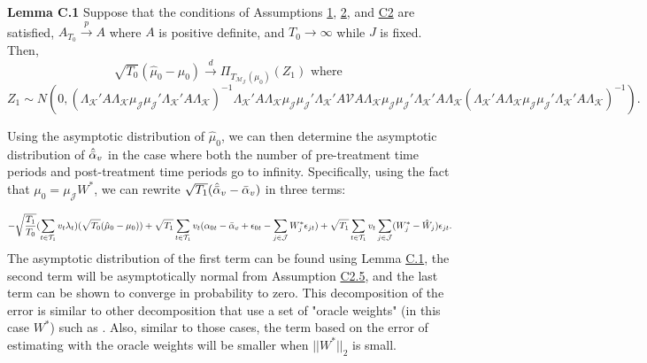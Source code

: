 \documentclass{article}
\begin{document}
\textbf{Lemma C.1} \label{LC1} Suppose that the conditions of Assumptions \hyperref[A1]{1}, \hyperref[A2]{2}, and \hyperref[AC2]{C2} are satisfied, $A_{T_0} \overset{p}{\rightarrow} A$ where $A$ is positive definite, and $T_0\rightarrow \infty$ while $J$ is fixed. Then,
$$\sqrt{T_0}(\hat{\mu}_0 - \mu_0) \overset{d}{\rightarrow} \Pi_{T_{\mathcal{M}_{\mathcal{J}}}(\mu_0)} (Z_{1}) \text{ where }$$
$$Z_1 \sim  N(0, (\Lambda_{\mathcal{K}}' A \Lambda_{\mathcal{K}} \mu_{\mathcal{J}} \mu_{\mathcal{J}}' \Lambda_{\mathcal{K}}' A \Lambda_{\mathcal{K}})^{-1} \Lambda_{\mathcal{K}}' A \Lambda_{\mathcal{K}} \mu_{\mathcal{J}} \mu_{\mathcal{J}}' \Lambda_{\mathcal{K}}' A \mathcal{V} A \Lambda_{\mathcal{K}} \mu_{\mathcal{J}} \mu_{\mathcal{J}}' \Lambda_{\mathcal{K}}' A \Lambda_{\mathcal{K}} (\Lambda_{\mathcal{K}}' A \Lambda_{\mathcal{K}} \mu_{\mathcal{J}} \mu_{\mathcal{J}}' \Lambda_{\mathcal{K}}' A \Lambda_{\mathcal{K}})^{-1}).$$ 
\par
Using the asymptotic distribution of $\hat{\mu}_0$, we can then determine the asymptotic distribution of $\hat{\Bar{\alpha}}_v$ in the case where both the number of pre-treatment time periods and post-treatment time periods go to infinity. Specifically, using the fact that $\mu_0 = \mu_{\mathcal{J}}W^*$, we can rewrite $\sqrt{T_1}(\hat{\Bar{\alpha}}_v - \Bar{\alpha}_v)$ in three terms:

$$-\sqrt{\frac{T_1}{T_0}}(\sum_{t \in \mathcal{T}_1} v_t \lambda_t)(\sqrt{T_0}(\hat{\mu}_0 - \mu_0)) + \sqrt{T_1}\sum_{t \in \mathcal{T}_1} v_t (\alpha_{0t} - \Bar{\alpha}_v + \epsilon_{0t} - \sum_{j \in \mathcal{J}} W_j^* \epsilon_{jt}) + \sqrt{T_1}\sum_{t \in \mathcal{T}_1}v_t \sum_{j \in \mathcal{J}} (W_j^* - \hat{W}_j)\epsilon_{jt}.$$
The asymptotic distribution of the first term can be found using Lemma \hyperref[LC1]{C.1}, the second term will be asymptotically normal from Assumption \hyperref[AC2]{C2.5}, and the last term can be shown to converge in probability to zero. This decomposition of the error is similar to other decomposition that use a set of "oracle weights" (in this case $W^*$) such as \cite{SDID}. Also, similar to those cases, the term based on the error of estimating with the oracle weights will be smaller when $||W^*||_2$ is small.
\end{document}
